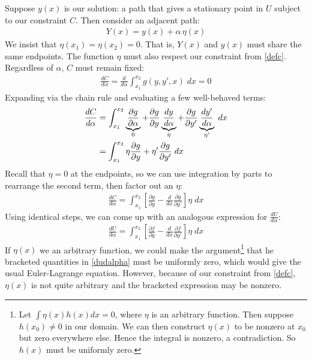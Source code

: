 \documentclass{article}
\begin{document}
Suppose $y(x)$ is our solution: a path that gives a stationary point in $U$ subject to our constraint $C$. Then consider an adjacent path:
\begin{align}
    \label{defy}
    Y(x) = y(x) + \alpha \, \eta(x)
\end{align}
We insist that $\eta(x_1) = \eta(x_2) = 0$. That is, $Y(x)$ and $y(x)$ must share the same endpoints. The function $\eta$ must also respect our constraint from \cref{defc}. Regardless of $\alpha$, $C$ must remain fixed:
\begin{align}
    \frac{dC}{d\alpha} = \frac{d}{d\alpha} \displaystyle\int_{x_1}^{x_2} g(y, y', x) \; dx = 0
\end{align}
Expanding via the chain rule and evaluating a few well-behaved terms:
\begin{align}
    \frac{dC}{d\alpha} &= \displaystyle\int_{x_1}^{x_2} \underbrace{ \frac{\partial g}{\partial \alpha} }_{0} + \frac{\partial g}{\partial y} \underbrace{ \frac{dy}{d\alpha} }_{\eta} + \frac{\partial g}{\partial y'} \underbrace{ \frac{dy'}{d\alpha} }_{\eta'} \; dx \notag \\
    &= \displaystyle\int_{x_1}^{x_2} \eta \frac{\partial g}{\partial y} + \eta' \frac{\partial g}{\partial y'} \; dx
\end{align}
Recall that $\eta=0$ at the endpoints, so we can use integration by parts to rearrange the second term, then factor out an $\eta$:
\begin{align}
\label{dcdalpha}
\frac{dC}{d\alpha}
=
\displaystyle\int_{x_1}^{x_2} \left[ \frac{\partial g}{\partial y} - \frac{d}{dx} \frac{\partial g}{\partial y'} \right] \eta \; dx    
\end{align}
Using identical steps, we can come up with an analogous expression for $\tfrac{dU}{d\alpha}$:
\begin{align}
\label{dudalpha}
\frac{dU}{d\alpha}
=
\displaystyle\int_{x_1}^{x_2} \left[ \frac{\partial f}{\partial y} - \frac{d}{dx} \frac{\partial f}{\partial y'} \right] \eta \; dx
\end{align}
If $\eta(x)$ we an arbitrary function, we could make the argument\footnote{
Let $\int \eta(x) h(x) dx = 0$, where $\eta$ is an arbitrary function. Then suppose $h(x_0) \not = 0$ in our domain. We can then construct $\eta(x)$ to be nonzero at $x_0$ but zero everywhere else. Hence the integral is nonzero, a contradiction. So $h(x)$ must be uniformly zero.
} that he bracketed quantities in \cref{dudalpha} must be uniformly zero, which would give the usual Euler-Lagrange equation. However, because of our constraint from \cref{defc}, $\eta(x)$ is not quite arbitrary and the bracketed expression may be nonzero.
\end{document}
